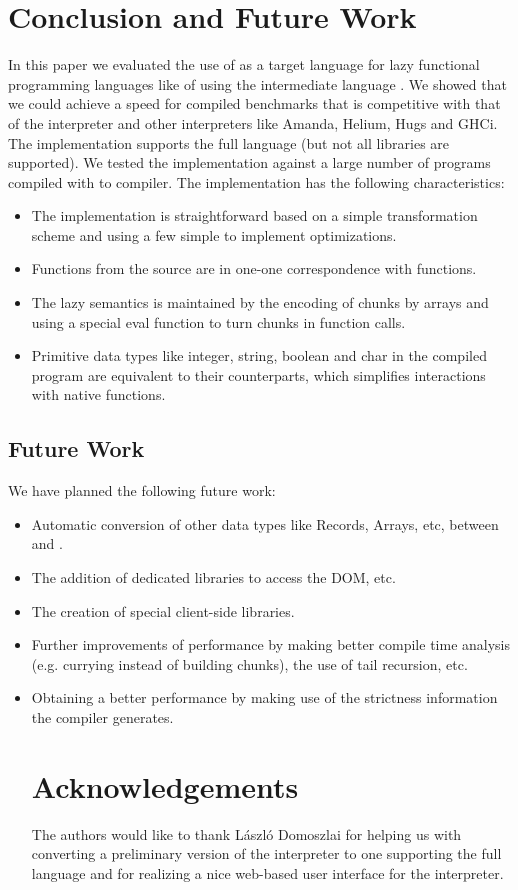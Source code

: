 \section{Conclusion and Future Work}\label{sapljs:sec:conclusions}
In this paper we evaluated the use of \JS as a target language for lazy functional programming languages like \Haskell of \Clean using the intermediate language \Sapl.
We showed that we could achieve a speed for compiled benchmarks 
that is competitive with that of the  \Sapl interpreter and other interpreters like \textsf{Amanda}, 
\textsf{Helium}, \textsf{Hugs} and \textsf{GHCi}.
The implementation supports the full \Clean language (but not all libraries are supported).
We tested the implementation against a large number of \Clean programs compiled with \Clean to \Sapl compiler. 
The implementation has the following characteristics:
\begin{itemize}
\item The implementation is straightforward based on a simple transformation scheme and using a few simple to implement optimizations.
\item Functions from the source are in one-one correspondence with \JS functions.
\item The lazy semantics is maintained by the encoding of chunks by \JS arrays and using a special \textsf{eval} function to turn chunks in function calls.
\item Primitive data types like integer, string, boolean and char in the compiled program are equivalent to their \JS counterparts, which simplifies interactions with native \JS functions.
\end{itemize}

\subsection{Future Work}
We have planned the following future work:
\begin{itemize}
\item Automatic conversion of other data types like Records, Arrays, etc, between \Sapl and \JS.
\item The addition of dedicated libraries to access the DOM, etc.
\item The creation of special client-side \iTask libraries.
\item Further improvements of performance by making better compile time analysis (e.g. \JS currying instead of building chunks),
the use of tail recursion, etc.
\item Obtaining a better performance by making use of the strictness information the \Clean compiler generates.

\section*{Acknowledgements}
The authors would like to thank L\'aszl\'o Domoszlai for helping us with converting a preliminary version of the interpreter to one supporting the full \Sapl language and
for realizing a nice web-based user interface for the interpreter.
\end{itemize}